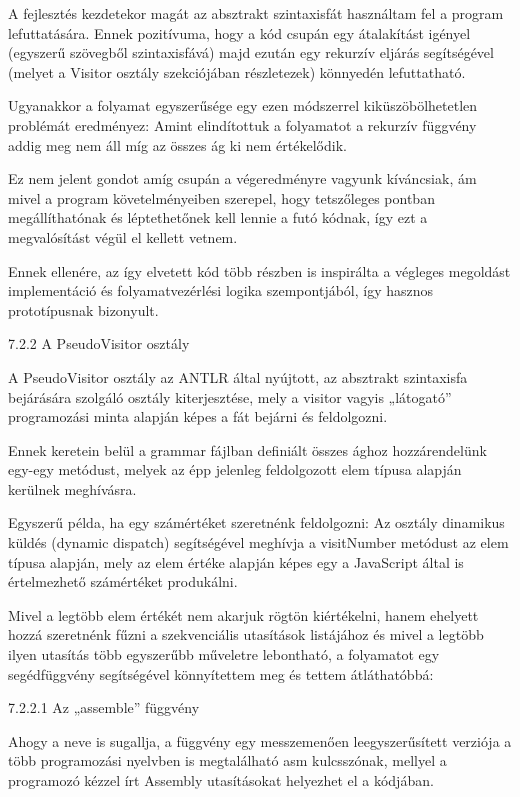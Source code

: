 A fejlesztés kezdetekor magát az absztrakt szintaxisfát használtam fel a program lefuttatására. Ennek pozitívuma, hogy a kód csupán egy átalakítást igényel (egyszerű szövegből szintaxisfává) majd ezután egy rekurzív eljárás segítségével (melyet a Visitor osztály szekciójában részletezek) könnyedén lefuttatható.

Ugyanakkor a folyamat egyszerűsége egy ezen módszerrel kiküszöbölhetetlen problémát eredményez: Amint elindítottuk a folyamatot a rekurzív függvény addig meg nem áll míg az összes ág ki nem értékelődik. 

Ez nem jelent gondot amíg csupán a végeredményre vagyunk kíváncsiak, ám mivel a program követelményeiben szerepel, hogy tetszőleges pontban megállíthatónak és léptethetőnek kell lennie a futó kódnak, így ezt a megvalósítást végül el kellett vetnem.

Ennek ellenére, az így elvetett kód több részben is inspirálta a végleges megoldást implementáció és folyamatvezérlési logika szempontjából, így hasznos prototípusnak bizonyult.

7.2.2 A PseudoVisitor osztály

A PseudoVisitor osztály az ANTLR által nyújtott, az absztrakt szintaxisfa bejárására szolgáló osztály kiterjesztése, mely a visitor vagyis „látogató” programozási minta alapján képes a fát bejárni és feldolgozni.

Ennek keretein belül a grammar fájlban definiált összes ághoz hozzárendelünk egy-egy metódust, melyek az épp jelenleg feldolgozott elem típusa alapján kerülnek meghívásra.

Egyszerű példa, ha egy számértéket szeretnénk feldolgozni: Az osztály dinamikus küldés (dynamic dispatch) segítségével meghívja a visitNumber metódust az elem típusa alapján, mely az elem értéke alapján képes egy a JavaScript által is értelmezhető számértéket produkálni.

Mivel a legtöbb elem értékét nem akarjuk rögtön kiértékelni, hanem ehelyett hozzá szeretnénk fűzni a szekvenciális utasítások listájához és mivel a legtöbb ilyen utasítás több egyszerűbb műveletre lebontható, a folyamatot egy segédfüggvény segítségével könnyítettem meg és tettem átláthatóbbá:

7.2.2.1 Az „assemble” függvény

Ahogy a neve is sugallja, a függvény egy messzemenően leegyszerűsített verziója a több programozási nyelvben is megtalálható asm kulcsszónak, mellyel a programozó kézzel írt Assembly utasításokat helyezhet el a kódjában.

